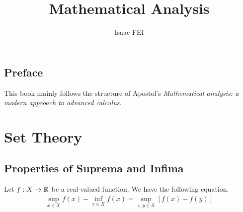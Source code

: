 \documentclass[thmcnt=section, 12pt]{my-elegantbook}
\title{Mathematical Analysis}
\author{Isaac FEI}
\begin{document}
\maketitle


\frontmatter
\section*{Preface}

This book mainly follows the structure of Apostol's \textit{Mathematical analysis: a modern approach to advanced calculus}\cite{apostolMathematicalAnalysisModern1974}.


\tableofcontents
\mainmatter



\chapter{Set Theory}


\section{Properties of Suprema and Infima}

\begin{theorem} \label{thm:27}
    Let $f: X \to \mathbb{R}$ be a real-valued function. We have the following equation.
    \begin{align}
        \sup_{x \in X} f(x) - \inf_{x \in X} f(x)
        = \sup_{x,y \in X} [f(x) - f(y)]
        \label{eq:66}
    \end{align}
\end{theorem}
\end{document}

